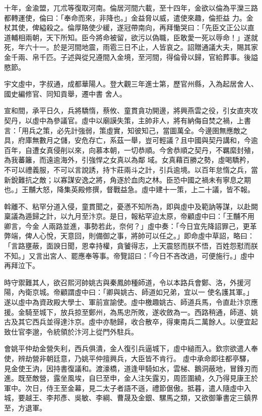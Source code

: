 \begin{pinyinscope}
 十年，金渝盟，兀朮等復取河南。倫居河間六載，至十四年，金欲以倫為平灤三路都轉運使，倫曰：「奉命而來，非降也。」金益脅以威，遣使來趣，倫拒益
 力。金杖其使，俾縊殺之。倫厚賂使少緩，遂冠帶南向，再拜慟哭曰：「先臣文正公以直道輔相兩朝，天下所知。臣今將命被留，欲污以偽職，臣敢愛一死以辱命！」遂就死，年六十一。於是河間地震，雨雹三日不止，人皆哀之。詔贈通議大夫，賜其家金千兩、帛千匹。子述與從兄遵間入金境，至河間，得倫骨以歸，官給葬事。後謚愍節。



 宇文虛中，字叔通，成都華陽人。登大觀三年進士第，歷官州縣，入為起居舍人、國史編修官、同知貢舉，遷中書
 舍人。



 宣和間，承平日久，兵將驕惰，蔡攸、童貫貪功開邊，將興燕雲之役，引女直夾攻契丹，以虛中為參議官。虛中以廟謨失策，主帥非人，將有納侮自焚之禍，上書言：「用兵之策，必先計強弱，策虛實，知彼知己，當圖萬全。今邊圉無應敵之具，府庫無數月之儲，安危存亡，系茲一舉，豈可輕議？且中國與契丹講和，今逾百年，自遭女真侵削以來，向慕本朝，一切恭順。今舍恭順之契丹，不羈縻封殖，為我蕃籬，而遠逾海外，引強悍之女真以為鄰
 域。女真藉百勝之勢，虛喝驕矜，不可以禮義服，不可以言說誘，持卞莊兩斗之計，引兵逾境。以百年怠惰之兵，當新銳難抗之敵；以寡謀安逸之將，角逐於血肉之林。臣恐中國之禍未有寧息之期也。」王黼大怒，降集英殿修撰，督戰益急。虛中建十一策，上二十議，皆不報。



 斡離不、粘罕分道入侵，童貫聞之，憂懣不知所為，即與虛中及範訥等謀，以赴闕稟議為遁歸之計，以九月至汴京。是日，報粘罕迫太原，帝顧虛中曰：「王黼不用卿言，今金
 人兩路並進，事勢若此，奈何？」虛中奏：「今日宜先降詔罪己，更革弊端，俾人心悅，天意回，則備御之事，將帥可以任之。」即命虛中草詔，略曰：「言路壅蔽，面諛日聞，恩幸持權，貪饕得志，上天震怒而朕不悟，百姓怨懟而朕不知。」又言出宮人、罷應奉等事。帝覽詔曰：「今日不吝改過，可便施行。」虛中再拜泣下。



 時守禦難其人，欲召熙河帥姚古與秦鳳帥種師道，令以本路兵會鄭、洛，外援河陽，內衛京城。帝顧謂虛中曰：「卿與姚古、師道如兄弟，宜以一
 使名護其軍。」遂以虛中為資政殿大學士、軍前宣諭使。虛中檄趣姚古、師道兵馬，令直赴汴京應援。金騎至城下，放兵掠至鄭州，為馬忠所敗，遂收斂為一。西路稍通，師道、姚古及其它西兵並得達汴京。虛中亦馳歸，收合散卒，得東南兵二萬餘人。以便宜起致仕官李邈，令統領於汴河上從門外駐兵。



 會姚平仲劫金營失利，西兵俱潰，金人復引兵逼城下，虛中縋而入。欽宗欲遣人奉使，辨劫營非朝廷意，乃姚平仲擅興兵，大臣皆不肯行。
 虛中承命即往都亭驛，見金使王汭，因持書復議和。渡濠橋，道逢甲騎如水，雲梯、鵝洞蔽地，冒鋒刃而進。既至敵營，露坐風埃，自巳至申，金人注矢露刃，周匝圍繞，久乃得見康王於軍中。次日，侍王至金幕，見二太子者語不遜，禮節倨傲。抵暮，遣人隨虛中入城，要越王、李邦彥、吳敏、李綱、曹晟及金銀、騾馬之類，又欲御筆書定三鎮界至，方退軍。




\end{pinyinscope}
